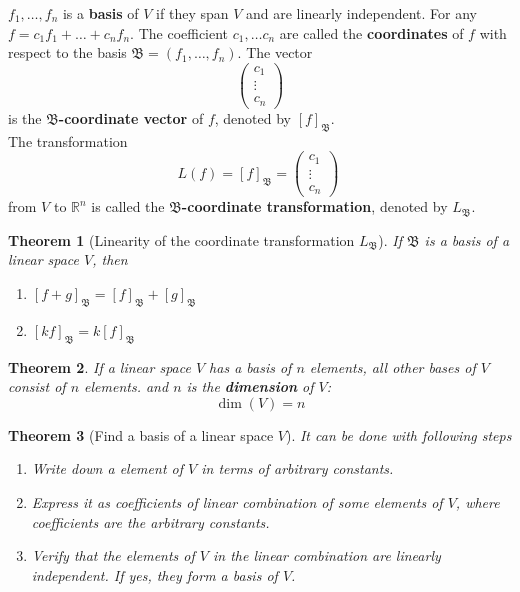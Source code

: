 \documentclass[letter]{article}
\newcommand{\R}{\mathbb{R}}
\newcommand{\B}{\mathfrak{B}}
\newtheorem{theorem}{Theorem}[section]
\newenvironment{definition}[1][Definition]{\begin{trivlist}
\item[\hskip \labelsep {\bfseries #1}]}{\end{trivlist}}
\begin{document}
\begin{definition}
$f_1,\ldots,f_n$ is a \textbf{basis} of $V$ if they span $V$ and are linearly independent. For any $f = c_1f_1+\ldots+c_nf_n$. The coefficient $c_1,\ldots c_n$ are called the \textbf{coordinates} of $f$ with respect to the basis $\B = (f_1,\ldots,f_n)$. The vector 
\[\begin{pmatrix}
c_1\\
\vdots\\
c_{n}
\end{pmatrix}\]
is the \textbf{$\B$-coordinate vector} of $f$, denoted by $[f]_{\B}$.\\
The transformation
\[
L(f) = [f]_{\B} = \begin{pmatrix}
c_1\\
\vdots\\
c_{n}
\end{pmatrix}\
\]
from $V$ to $\R^n$ is called the \textbf{$\B$-coordinate transformation}, denoted by $L_\B$.
\end{definition}

\begin{theorem}[Linearity of the coordinate transformation $L_\B$]
If $\B$ is a basis of a linear space $V$, then
\begin{enumerate}
\item $[f+g]_\B = [f]_\B + [g]_\B$
\item $[kf]_\B = k [f]_\B$
\end{enumerate}
\end{theorem}

\begin{theorem}
If a linear space $V$ has a basis of $n$ elements, all other bases of $V$ consist of $n$ elements. and $n$ is the \textbf{dimension} of $V$:
\[\dim(V) = n\]
\end{theorem}

\begin{theorem}[Find a basis of a linear space $V$]
It can be done with following steps
\begin{enumerate}
\item Write down a element of $V$ in terms of arbitrary constants.
\item Express it as coefficients of linear combination of some elements of $V$, where coefficients are the arbitrary constants.
\item Verify that the elements of $V$ in the linear combination are linearly independent. If yes, they form a basis of $V$.
\end{enumerate}
\end{theorem}
\end{document}
